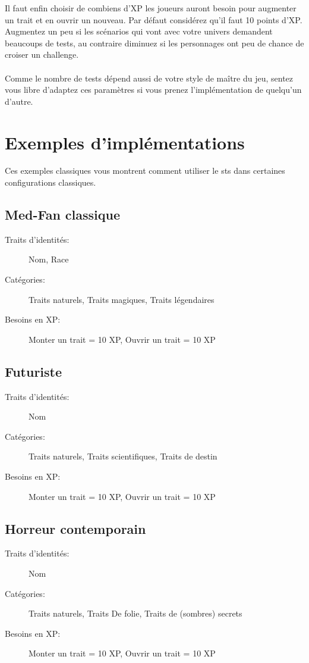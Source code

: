 \documentclass[a4paper,10pt,twoside,twocolumn]{article}
\begin{document}
 Il faut enfin choisir de combiens d'XP les joueurs auront besoin pour augmenter un trait et en ouvrir un nouveau. Par défaut considérez qu'il faut 10 points d'XP. Augmentez un peu si les scénarios qui vont avec votre univers demandent beaucoups de tests, au contraire diminuez si les personnages ont peu de chance de croiser un challenge.\\
 \\
 Comme le nombre de tests dépend aussi de votre style de maître du jeu, sentez vous libre d'adaptez ces paramètres si vous prenez l'implémentation de quelqu'un d'autre.
 
 \section{Exemples d'implémentations}
 \label{exempl}
 
 Ces exemples classiques vous montrent comment utiliser le sts dans certaines configurations classiques.
 
 \subsection{Med-Fan classique}
 
 \begin{description}
  \item [Traits d'identités:] Nom, Race
  \item [Catégories:] Traits naturels, Traits magiques, Traits légendaires
  \item [Besoins en XP:] Monter un trait = 10 XP, Ouvrir un trait = 10 XP
 \end{description}
 
 \subsection{Futuriste}
 
 \begin{description}
  \item [Traits d'identités:] Nom
  \item [Catégories:] Traits naturels, Traits scientifiques, Traits de destin
  \item [Besoins en XP:] Monter un trait = 10 XP, Ouvrir un trait = 10 XP
 \end{description}
 
 \subsection{Horreur contemporain}
 
 \begin{description}
  \item [Traits d'identités:] Nom
  \item [Catégories:] Traits naturels, Traits De folie, Traits de (sombres) secrets
  \item [Besoins en XP:] Monter un trait = 10 XP, Ouvrir un trait = 10 XP
 \end{description}
 
\end{document}
